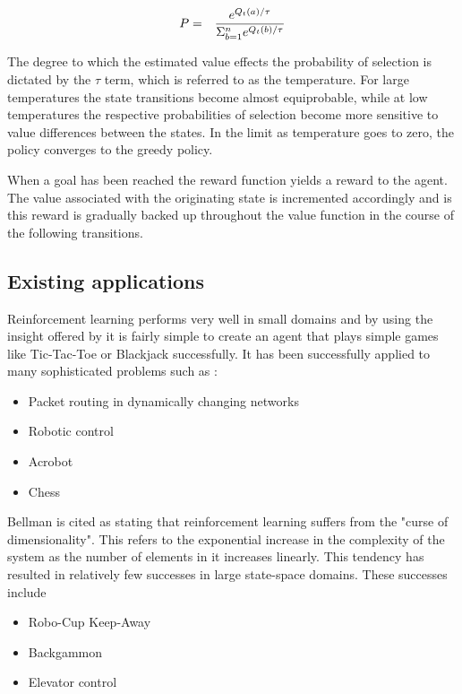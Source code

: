 \documentclass{rucsthesis}
\begin{document}
\begin{eqnarray}
\centering
P & = & \frac{e^{Q_{t}(a)/\tau}}{\Sigma_{b=1}^{n}e^{Q_{t}(b)/\tau}} \label{eq:softmax}
\end{eqnarray}

The degree to which the estimated value effects the probability of selection is dictated by the $\tau$ term, which is referred to as the temperature. For large temperatures the state transitions become almost equiprobable, while at low temperatures the respective probabilities of selection become more sensitive to value differences between the states.  In the limit as temperature goes to zero, the policy converges to the greedy policy.

When a goal has been reached the reward function yields a reward to the agent.  The value  associated with the originating state is incremented accordingly and is this reward is gradually backed up throughout the value function in the course of the following transitions\citep{suttonbarto}.


\subsection{Existing applications}

Reinforcement learning performs very well in small domains and by using the insight offered by \cite{suttonbarto} it is fairly simple to create an agent that plays simple games like Tic-Tac-Toe or Blackjack successfully. It has been successfully applied to many sophisticated problems such as :

\begin{itemize}
\item{Packet routing in dynamically changing networks \citep{boyan94packet}}
\item{Robotic control \citep{rlrobotics}}
\item{Acrobot \citep{suttonbarto} }
\item{Chess \citep{baxter98knightcap}}
\end{itemize}

Bellman is cited \citep{suttonbarto} as stating that reinforcement learning suffers from the "curse of dimensionality".  This refers to the exponential increase in the complexity of the system as the number of elements in it increases linearly. This tendency has resulted in relatively few successes in large state-space domains\citep{keepaway}. These successes include 

\begin{itemize}
\item{Robo-Cup Keep-Away \citep{keepaway}}
\item{Backgammon \citep{tdgammon}}
\item{Elevator control \citep{elevator}}
\end{itemize}
\end{document}
